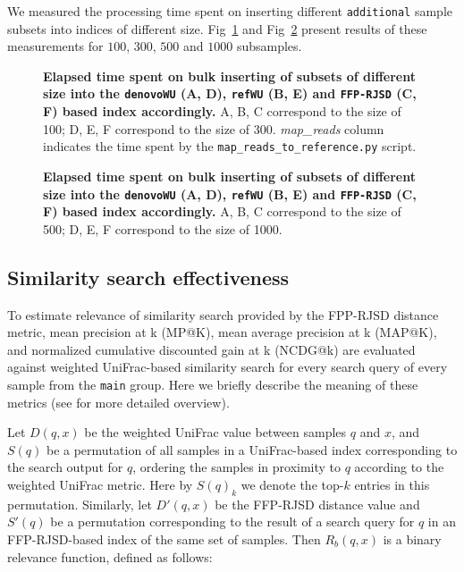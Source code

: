 \documentclass[10pt,letterpaper]{article}
\begin{document}
We measured the processing time spent on inserting different \texttt{additional} sample subsets into indices of different size. Fig~\ref{fig3} and Fig~\ref{fig4} present results of these measurements for $100$, $300$, $500$ and $1000$ subsamples. 

\begin{figure}[!h]
\caption{{\bf Elapsed time spent on bulk inserting of subsets of different size into the \texttt{denovoWU} (A, D), \texttt{refWU} (B, E) and \texttt{FFP-RJSD} (C, F) based index accordingly.}
A, B, C correspond to the size of 100; D, E, F correspond to the size of 300. \textit{map\_reads} column indicates the time
spent by the \texttt{map\_reads\_to\_reference.py} script. }
\label{fig3}
\end{figure}


\begin{figure}[!h]
\caption{{\bf Elapsed time spent on bulk inserting of subsets of different size into the \texttt{denovoWU} (A, D), \texttt{refWU} (B, E) and \texttt{FFP-RJSD} (C, F) based index accordingly.}
A, B, C correspond to the size of 500; D, E, F correspond to the size of 1000.}
\label{fig4}
\end{figure}

\subsection*{Similarity search effectiveness}
To estimate relevance of similarity search provided by the FPP-RJSD distance metric, mean precision at k (MP@K), mean average precision at k (MAP@K), 
and normalized cumulative discounted gain at k (NCDG@k) \cite{informationretrieval2008, jarvelin2000ir, jarvelin2002cumulated}
are evaluated against weighted UniFrac-based similarity search for every search query of every sample from the \texttt{main} group. 
Here we briefly describe the meaning of these metrics (see \cite{informationretrieval2008} for more detailed overview).

Let $D(q, x)$ be the weighted UniFrac value between samples $q$ and $x$, and $S(q)$ be a permutation of all samples in a UniFrac-based index corresponding to the search output for $q$, ordering the samples in proximity to $q$ according to the weighted UniFrac metric. 
Here by $S(q)_k$ we denote the top-$k$ entries in this permutation.
Similarly, let $D'(q, x)$ be the FFP-RJSD distance value and $S'(q)$ be a permutation corresponding to the result of a search query for $q$ in an FFP-RJSD-based index of the same set of samples.
Then $R_b(q, x)$ is a binary relevance function, defined as follows:
\end{document}
